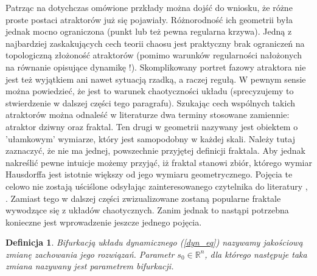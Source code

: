 \documentclass[12pt, twoside]{book}
\newtheorem{defi}{Definicja}
\begin{document}
Patrząc na dotychczas omówione przkłady można dojść do wniosku, że różne proste postaci atraktorów już się pojawiały. Różnorodność ich geometrii była jednak mocno ograniczona (punkt lub też pewna regularna krzywa). Jedną z najbardziej zaskakujących cech teorii chaosu jest praktyczny brak ograniczeń na topologiczną złożoność atraktorów (pomimo warunków regularności nałożonych na równanie opisujące dynamikę !). Skomplikowany portret fazowy atraktora nie jest też wyjątkiem ani nawet sytuacją rzadką, a raczej regułą. W pewnym sensie można powiedzieć, że jest to warunek chaotyczności układu (sprecyzujemy to stwierdzenie w dalszej części tego paragrafu). Szukając cech wspólnych takich atraktorów można odnaleść w literaturze dwa terminy stosowane zamiennie: atraktor dziwny oraz fraktal. Ten drugi w geometrii nazywany jest obiektem o 'ułamkowym' wymiarze, który jest samopodobny w każdej skali. Należy tutaj zaznaczyć, że nie ma jednej, powszechnie przyjętej definicji fraktala. Aby jednak nakreślić pewne intuicje możemy przyjąć, iż fraktal stanowi zbiór, którego wymiar Hausdorffa jest istotnie większy od jego wymiaru geometrycznego. Pojęcia te celowo nie zostają uściślone odsyłając zainteresowanego czytelnika do literatury \cite{Tempczyk}, \cite{Kudrewicz}. Zamiast tego w dalszej części zwizualizowane zostaną popularne fraktale wywodzące się z układów chaotycznych. Zanim jednak to nastąpi potrzebna konieczne jest wprowadzenie jeszcze jednego pojęcia.
\begin{defi}
	Bifurkacją układu dynamicznego (\ref{dyn_eq}) nazywamy jakościową zmianę zachowania jego rozwiązań. Parametr $ s_{0} \in \mathbb{R}^{n} $, dla którego następuje taka zmiana nazywany jest parametrem bifurkacji. 
\end{defi}
\end{document}
